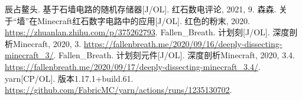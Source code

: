 \documentclass{article}
\begin{document}
    \begin{thebibliography}{99}
        辰占鳌头. 基于石墙电路的随机存储器[J/OL]. 红石数电评论, 2021, 9.
        森森. 关于“墙”在Minecraft红石数字电路中的应用[J/OL]. 红色的粉末, 2020. \url{https://zhuanlan.zhihu.com/p/375262793}.
        Fallen\_Breath. 计划刻[J/OL]. 深度剖析Minecraft, 2020, 3. \url{https://fallenbreath.me/2020/09/16/deeply-dissecting-minecraft_3/}.
        Fallen\_Breath. 计划刻元件[J/OL]. 深度剖析Minecraft, 2020, 3.4. \url{https://fallenbreath.me/2020/09/17/deeply-dissecting-minecraft_3.4/}.
        yarn[CP/OL]. 版本1.17.1+build.61. \url{https://github.com/FabricMC/yarn/actions/runs/1235130702}.
    \end{thebibliography}
\end{document}
